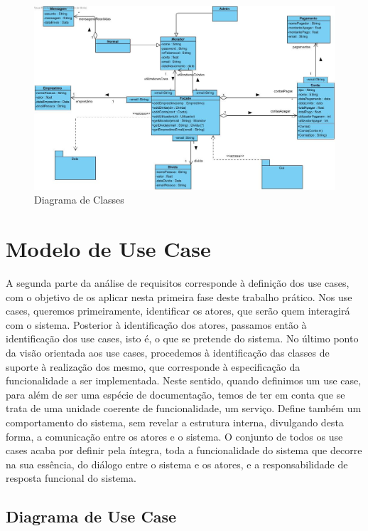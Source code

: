 \begin{figure}[htb!]
	\centering
	\includegraphics[scale=0.47]{imagens/diagramaClasses/DiagramaClasse}  
	\caption{Diagrama de Classes }  
\end{figure}


\newpage

\section{Modelo de Use Case}
A segunda parte da análise de requisitos corresponde à definição dos use cases, com o objetivo de os aplicar nesta primeira fase deste trabalho prático. Nos use cases, queremos primeiramente, identificar os atores, que serão quem interagirá com o sistema.
Posterior à identificação dos atores, passamos então à identificação dos use cases, isto é, o que se pretende do sistema. No último ponto da visão orientada aos use cases, procedemos à identificação das classes de suporte à realização dos mesmo, que corresponde à especificação da funcionalidade a ser implementada.
Neste sentido, quando definimos um use case, para além de ser uma espécie de documentação, temos de ter em conta que se trata de uma unidade coerente de funcionalidade, um serviço. Define também um comportamento do sistema, sem revelar a estrutura interna, divulgando desta forma, a comunicação entre os atores e o sistema.
O conjunto de todos os use cases acaba por definir pela íntegra, toda a funcionalidade do sistema que decorre na sua essência, do diálogo entre o sistema e os atores, e a responsabilidade de resposta funcional do sistema.


\subsection{Diagrama de Use Case}


